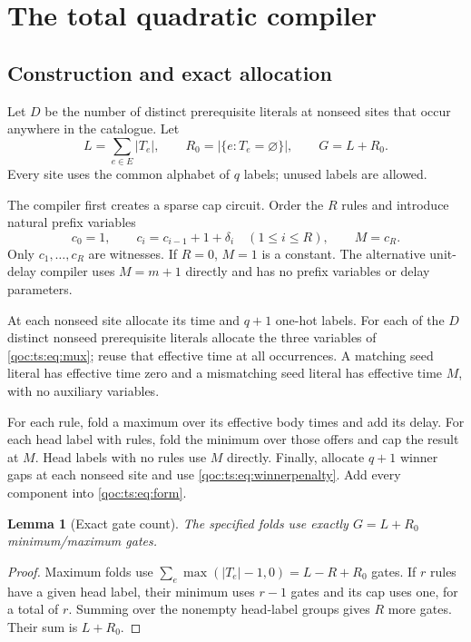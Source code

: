 \documentclass[11pt,letterpaper]{article}
\newtheorem{lemma}[theorem]{Lemma}
\theoremstyle{definition}
\theoremstyle{remark}
\begin{document}
\section{The total quadratic compiler}
\subsection{Construction and exact allocation}
Let $D$ be the number of distinct prerequisite literals at nonseed sites
that occur anywhere in the catalogue. Let
\[
 L=\sum_{e\in E}|T_e|,\qquad
 R_0=|\{e:T_e=\varnothing\}|,\qquad G=L+R_0.
\]
Every site uses the common alphabet of $q$ labels; unused labels are allowed.

The compiler first creates a sparse cap circuit. Order the $R$ rules and
introduce natural prefix variables
\begin{equation}\label{qoc:ts:eq:prefix}
 c_0=1,\qquad c_i=c_{i-1}+1+\delta_i\quad(1\le i\le R),
 \qquad M=c_R.
\end{equation}
Only $c_1,\ldots,c_R$ are witnesses. If $R=0$, $M=1$ is a constant.
The alternative unit-delay compiler uses $M=m+1$ directly and has no
prefix variables or delay parameters.

At each nonseed site allocate its time and $q+1$ one-hot labels. For each
of the $D$ distinct nonseed prerequisite literals allocate the three
variables of \eqref{qoc:ts:eq:mux}; reuse that effective time at all occurrences.
A matching seed literal has effective time zero and a mismatching seed
literal has effective time $M$, with no auxiliary variables.

For each rule, fold a maximum over its effective body times and add its
delay. For each head label with rules, fold the minimum over those offers
and cap the result at $M$. Head labels with no rules use $M$ directly.
Finally, allocate $q+1$ winner gaps at each nonseed site and use
\eqref{qoc:ts:eq:winnerpenalty}. Add every component into \eqref{qoc:ts:eq:form}.

\begin{lemma}[Exact gate count]\label{qoc:ts:lem:gatecount}
The specified folds use exactly $G=L+R_0$ minimum/maximum gates.
\end{lemma}
\begin{proof}
Maximum folds use
$\sum_e\max(|T_e|-1,0)=L-R+R_0$ gates. If $r$ rules have a given
head label, their minimum uses $r-1$ gates and its cap uses one, for a
total of $r$. Summing over the nonempty head-label groups gives $R$
more gates. Their sum is $L+R_0$.
\end{proof}
\end{document}

